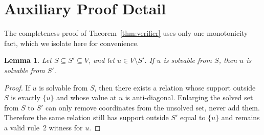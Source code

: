 \documentclass[11pt]{article}
\newtheorem{lemma}[theorem]{Lemma}
\theoremstyle{definition}
\begin{document}
\section{Auxiliary Proof Detail}
\label{app:proofs}

The completeness proof of Theorem~\ref{thm:verifier} uses only one monotonicity fact, which we isolate here for convenience.

\begin{lemma}
\label{lem:monotone}
Let $S\subseteq S'\subseteq V$, and let $u\in V\setminus S'$. If $u$ is solvable from $S$, then $u$ is solvable from $S'$.
\end{lemma}

\begin{proof}
If $u$ is solvable from $S$, then there exists a relation whose support outside $S$ is exactly $\{u\}$ and whose value at $u$ is anti-diagonal. Enlarging the solved set from $S$ to $S'$ can only remove coordinates from the unsolved set, never add them. Therefore the same relation still has support outside $S'$ equal to $\{u\}$ and remains a valid rule~2 witness for $u$.
\end{proof}



\end{document}
